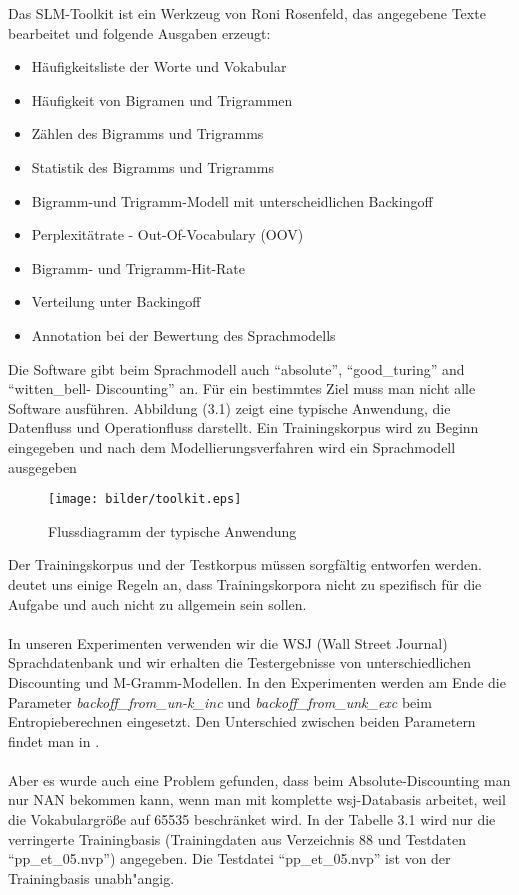 Das SLM-Toolkit ist ein Werkzeug von Roni Rosenfeld, das angegebene Texte bearbeitet und folgende Ausgaben erzeugt\cite{int_slm_toolkit}:
\begin{itemize}
	\item H\"aufigkeitsliste der Worte und Vokabular
	\item H\"aufigkeit von Bigramen und Trigrammen
	\item Z\"ahlen des Bigramms und Trigramms
	\item Statistik des Bigramms und Trigramms
	\item Bigramm-und Trigramm-Modell mit unterscheidlichen Backingoff
	\item Perplexit\"atrate  - Out-Of-Vocabulary (OOV) 
	\item Bigramm- und Trigramm-Hit-Rate
	\item Verteilung unter Backingoff 
	\item Annotation bei der Bewertung des Sprachmodells 
\end{itemize}
Die Software gibt beim Sprachmodell auch "`absolute"', "`good\_turing"' and "`witten\_bell- Discounting"' an.
F\"ur ein bestimmtes Ziel muss man nicht alle Software ausf\"uhren. Abbildung (3.1) zeigt eine typische Anwendung, die Datenfluss und Operationfluss darstellt.
Ein Trainingskorpus wird zu Beginn eingegeben und nach dem Modellierungsverfahren wird ein Sprachmodell ausgegeben
\begin{figure}[h]
	\centering
	\texttt{[image: bilder/toolkit.eps]}
	 \caption{Flussdiagramm der typische Anwendung}
  \label{fig:figure_2}
\end{figure}
Der Trainingskorpus und der Testkorpus m\"ussen sorgf\"altig entworfen werden. \cite{book_speech} deutet uns einige Regeln an, dass Trainingskorpora nicht zu spezifisch f\"ur die Aufgabe und auch nicht zu allgemein sein sollen.  
\\
\\
In unseren Experimenten verwenden wir die WSJ (Wall Street Journal) Sprachdatenbank und wir erhalten die Testergebnisse von unterschiedlichen Discounting und M-Gramm-Modellen. In den Experimenten werden am Ende die Parameter \emph{backoff\_from\_un-k\_inc} und \emph{backoff\_from\_unk\_exc} beim Entropieberechnen eingesetzt. Den Unterschied zwischen beiden Parametern findet man in \cite{int_slm_toolkit}.
\\
\\  
Aber es wurde auch eine Problem gefunden, dass beim Absolute-Discounting man nur NAN bekommen kann, wenn man mit komplette wsj-Databasis arbeitet, weil die Vokabulargr\"o\ss e auf 65535 beschr\"anket wird. In der Tabelle 3.1 wird nur die verringerte Trainingbasis (Trainingdaten aus Verzeichnis 88 und Testdaten "`pp\_et\_05.nvp"') angegeben. Die Testdatei "`pp\_et\_05.nvp"' ist von der Trainingbasis unabh"angig.
